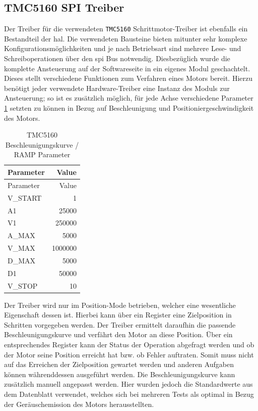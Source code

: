 \hypertarget{tmc5160-spi-treiber}{%
\subsection{TMC5160 SPI Treiber}\label{tmc5160-spi-treiber}}

Der Treiber für die verwendeten \passthrough{\lstinline!TMC5160!}
Schrittmotor-Treiber ist ebenfalls ein Bestandteil der \gls{hal}. Die
verwendeten Bausteine bieten mitunter sehr komplexe
Konfigurationsmöglichkeiten und je nach Betriebsart sind mehrere Lese-
und Schreiboperationen über den \gls{spi} Bus notwendig. Diesbezüglich
wurde die komplette Ansteuerung auf der Softwareseite in ein eigenes
Modul geschachtelt. Dieses stellt verschiedene Funktionen zum Verfahren
eines Motors bereit. Hierzu benötigt jeder verwendete Hardware-Treiber
eine Instanz des Moduls zur Ansteuerung; so ist es zusätzlich möglich,
für jede Achse verschiedene Parameter \ref{tmcrampparams} setzten zu
können in Bezug auf Beschleunigung und Positioniergeschwindigkeit des
Motors.

\begin{longtable}[]{@{}lr@{}}
\caption{TMC5160 Beschleunigungskurve / RAMP Parameter
\label{tmcrampparams}}\tabularnewline
\toprule
Parameter & Value\tabularnewline
\midrule
\endfirsthead
\toprule
Parameter & Value\tabularnewline
\midrule
\endhead
V\_START & 1\tabularnewline
A1 & 25000\tabularnewline
V1 & 250000\tabularnewline
A\_MAX & 5000\tabularnewline
V\_MAX & 1000000\tabularnewline
D\_MAX & 5000\tabularnewline
D1 & 50000\tabularnewline
V\_STOP & 10\tabularnewline
\bottomrule
\end{longtable}

Der Treiber wird nur im Position-Mode betrieben, welcher eine
wesentliche Eigenschaft dessen ist. Hierbei kann über ein Register eine
Zielposition in Schritten vorgegeben werden. Der Treiber ermittelt
daraufhin die passende Beschleunigungskurve und verfährt den Motor an
diese Position. Über ein entsprechendes Register kann der Status der
Operation abgefragt werden und ob der Motor seine Position erreicht hat
bzw. ob Fehler auftraten. Somit muss nicht auf das Erreichen der
Zielposition gewartet werden und anderen Aufgaben können währenddessen
ausgeführt werden. Die Beschleunigungskurve kann zusätzlich manuell
angepasst werden. Hier wurden jedoch die Standardwerte aus dem
Datenblatt verwendet, welches sich bei mehreren Tests als optimal in
Bezug der Geräuschemission des Motors herausstellten.

